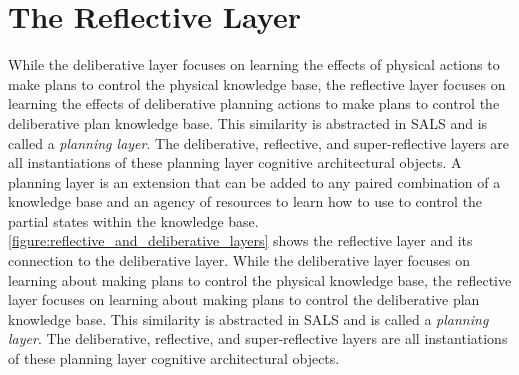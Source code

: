 \section{The Reflective Layer}
\label{section:the_reflective_layer}

While the deliberative layer focuses on learning the effects of
physical actions to make plans to control the physical knowledge base,
the reflective layer focuses on learning the effects of deliberative
planning actions to make plans to control the deliberative plan
knowledge base.  This similarity is abstracted in SALS and is called a
{\emph{planning layer}}.  The deliberative, reflective, and
super-reflective layers are all instantiations of these planning layer
cognitive architectural objects.  A planning layer is an extension
that can be added to any paired combination of a knowledge base and an
agency of resources to learn how to use to control the partial states
within the knowledge base.
{\mbox{\autoref{figure:reflective_and_deliberative_layers}}} shows the
reflective layer and its connection to the deliberative layer.  While
the deliberative layer focuses on learning about making plans to
control the physical knowledge base, the reflective layer focuses on
learning about making plans to control the deliberative plan knowledge
base.  This similarity is abstracted in SALS and is called a
{\emph{planning layer}}.  The deliberative, reflective, and
super-reflective layers are all instantiations of these planning layer
cognitive architectural objects.
